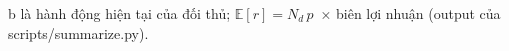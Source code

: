 b là hành động hiện tại của đối thủ; $\mathbb{E}[r] = N_d\, p\,$ × biên lợi nhuận (output của scripts/summarize.py).
